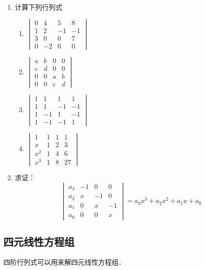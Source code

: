 \begin{ex}
\begin{enumerate}
    \item 计算下列行列式
\begin{multicols}{2}
\begin{enumerate}
    \item $\begin{vmatrix}
      0&4&5&8\\1&2&-1&-1\\
      3&0&0&7\\0&-2&0&0  
    \end{vmatrix}$
    \item $\begin{vmatrix}
        a&b&0&0\\c&d&0&0\\
        0&0&a&b\\0&0&c&d
    \end{vmatrix}$
    \item $\begin{vmatrix}
        1&1&1&1\\1&1&-1&-1\\
        1&-1&1&-1\\1&-1&-1&1
    \end{vmatrix}$
    \item $\begin{vmatrix}
        1&1&1&1\\x&1&2&3\\
        x^2&1&4&6\\x^3&1&8&27
    \end{vmatrix}$
\end{enumerate}
\end{multicols}
    \item 求证：
\[\begin{vmatrix}
    a_3&-1&0&0\\
    a_2&x&-1&0\\
    a_1&0&x&-1\\
    a_0&0&0&x
\end{vmatrix}=a_3x^3+a_2x^2+a_1x+a_0\]
\end{enumerate}    
\end{ex}
    
\subsection{四元线性方程组}
四阶行列式可以用来解四元线性方程组．

